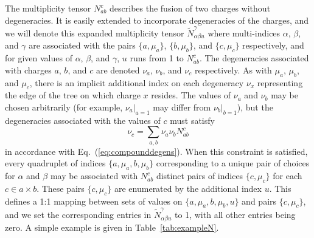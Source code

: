 \documentclass[aps,prb,reprint,superscriptaddress,amsfonts,amsmath,amssymb,showpacs,floatfix]{revtex4-1}
\newcommand{\eref}[1]{(\ref{#1})}
\newcommand{\tref}[1]{Table~\ref{#1}}
\newcommand{\p}[1]{\phantom{#1}}
\begin{document}
The multiplicity tensor $N^{c}_{ab}$ describes the fusion of two charges without degeneracies. It is easily extended to incorporate degeneracies of the charges, 
and we will denote this expanded multiplicity tensor $\tilde N^\gamma_{\alpha\beta u}$ 
where %
multi-indices $\alpha$, $\beta$, and $\gamma$ are associated with the pairs 
$\{a,\mu_a\}$, $\{b,\mu_b\}$, and $\{c,\mu_c\}$ respectively, and for given values of $\alpha$, $\beta$, and $\gamma$, $u$ runs from 1 to $N^c_{ab}$. 
The degeneracies associated with charges $a$, $b$, and $c$ are denoted $\nu_{a}$, $\nu_{b}$, and $\nu_c$ respectively. As with $\mu_a$, $\mu_b$, and $\mu_c$, there is an implicit additional index on each degeneracy $\nu_x$ representing the edge of the tree on which %
charge $x$ resides. 
The values of $\nu_a$ and $\nu_b$ may be chosen arbitrarily (for example, $\nu_{a}|_{a=1}$ may differ from $\nu_{b}|_{b=1}$), but the degeneracies associated with the values of $c$ must satisfy
\begin{equation}
\nu_{c}=\sum_{a,b} \nu_{a}\nu_{b}N^{c}_{ab}
\end{equation}
in accordance with Eq.~\eref{eq:compounddegens}. When this constraint is satisfied, 
every quadruplet of indices $\{a,\mu_a,b,\mu_b\}$ corresponding to a unique pair of choices for $\alpha$ and $\beta$ may be associated with $N^c_{ab}$ distinct
pairs of indices $\{c,\mu_c\}$ for each $c\in a\times b$. These pairs $\{c,\mu_c\}$ are enumerated by the additional index $u$. %
This defines a 1:1 mapping between sets of values on $\{a,\mu_a,b,\mu_b,u\}$ and pairs $\{c,\mu_c\}$,
%
and we set the corresponding entries in $\tilde N^\gamma_{\alpha\beta u}$ to 1, with all other entries being zero.
A simple example is given in \tref{tab:exampleN}.
\end{document}
